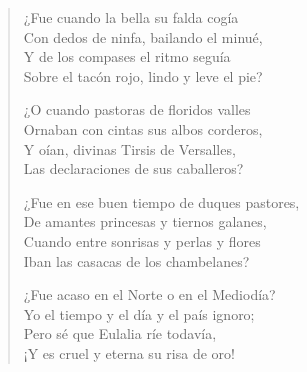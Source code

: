 \documentclass[12pt]{article}
\begin{document}
\begin{verse}
¿Fue cuando la bella su falda cogía\\
Con dedos de ninfa, bailando el minué,\\
Y de los compases el ritmo seguía\\
Sobre el tacón rojo, lindo y leve el pie?  

¿O cuando pastoras de floridos valles\\
Ornaban con cintas sus albos corderos,\\
Y oían, divinas Tirsis de Versalles,\\
Las declaraciones de sus caballeros?  

¿Fue en ese buen tiempo de duques pastores,\\
De amantes princesas y tiernos galanes,\\
Cuando entre sonrisas y perlas y flores\\
Iban las casacas de los chambelanes?  

¿Fue acaso en el Norte o en el Mediodía?\\
Yo el tiempo y el día y el país ignoro;\\
Pero sé que Eulalia ríe todavía,\\
¡Y es cruel y eterna su risa de oro!  

\end{verse}
\end{document}
